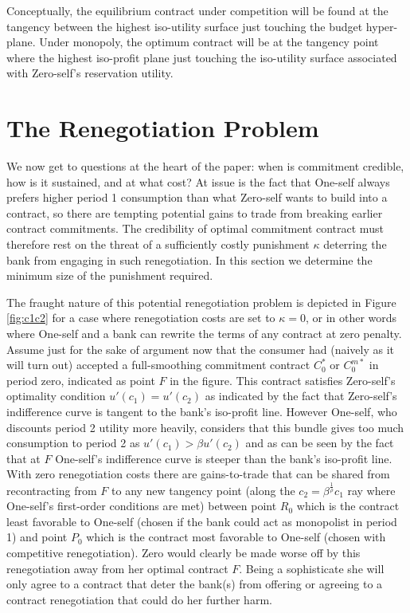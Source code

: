 \documentclass[11pt,english]{article}
\theoremstyle{plain}
\theoremstyle{definition}
\begin{document}
Conceptually,  the equilibrium contract under competition will be found
at the tangency between the highest iso-utility surface just touching
the budget hyper-plane. Under monopoly, the optimum contract will
be at the tangency point where the highest iso-profit plane just touching the iso-utility surface associated with Zero-self's reservation
utility.

\section{The Renegotiation Problem}\label{renegotiation}

We now get to questions at the heart of the paper: when is commitment
credible, how is it sustained, and at what cost? At issue is the fact
that One-self always prefers higher period 1 consumption than what Zero-self
wants to build into a contract, so there are tempting potential
gains to trade from breaking earlier contract commitments. The credibility
of optimal commitment contract must therefore rest on the threat
of a sufficiently costly punishment $\kappa$ deterring the bank from engaging
in such renegotiation. In this section we determine the minimum size
of the punishment required.

The fraught nature of this potential renegotiation problem
is depicted in Figure \ref{fig:c1c2} for a case where renegotiation
costs are set to $\kappa=0$, or in other words where One-self and a bank
can rewrite the terms of any contract at zero penalty. Assume \textendash{}
just for the sake of argument now \textendash{} that the consumer
had (naively as it will turn out) accepted a full-smoothing commitment
contract $C_{0}^{*}$ or $C_{0}^{m*}$ in period zero, indicated as
point $F$ in the figure. This contract satisfies Zero-self's optimality
condition $u'(c_{1})=u'(c_{2})$ as indicated by the fact that Zero-self's
indifference curve is tangent to the bank's iso-profit line. However One-self, who discounts period 2 utility more heavily, considers that this bundle gives too much consumption to period 2  as $u'(c_{1})>\beta u'(c_{2})$ and as can
be seen by the fact that at $F$ One-self's indifference curve is
steeper than the bank's iso-profit line. With zero renegotiation costs
there are gains-to-trade that can be shared from recontracting from
$F$ to any new tangency point (along the $c_{2}=\beta^{\frac{1}{\rho}}c_{1}$
ray where One-self's first-order conditions are met) between point
$R_{0}$ which is the contract least favorable to One-self (chosen if
the bank could act as monopolist in period 1) and point $P_{0}$ which
is the contract most favorable to One-self (chosen with competitive
renegotiation). Zero would clearly be made  worse off by this  renegotiation
away from her optimal contract $F$. Being a sophisticate she will only agree to a contract that deter the bank(s) from offering or agreeing to a contract renegotiation that could do her further harm.     
\end{document}
